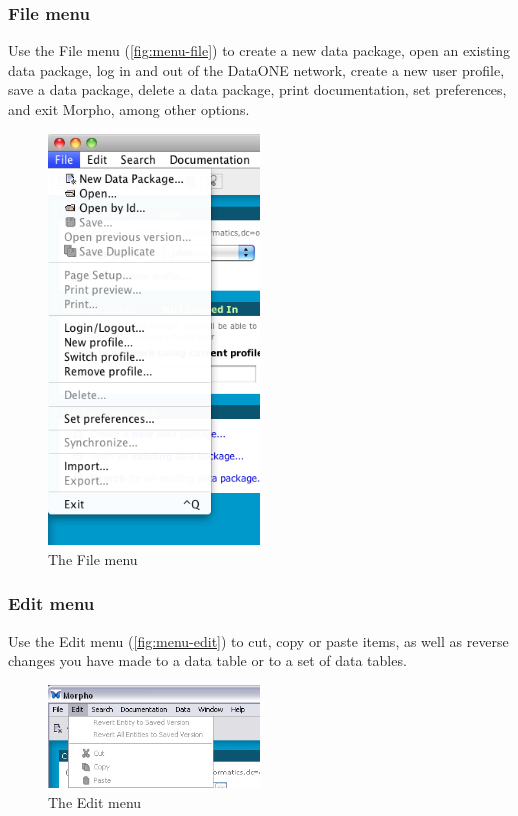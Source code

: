 \subsubsection{File menu} \label{sec:menu-file}

Use the File menu (\autoref{fig:menu-file}) to create a new data
package, open an existing data package, log in and out of the DataONE 
network, create a new user profile, save a data package, delete a data
package, print documentation, set preferences, and exit Morpho, among
other options. 

\begin{figure}
  \centering
    \includegraphics[width=0.5\textwidth]{images/menu-file.png}
  \caption{The File menu}
  \label{fig:menu-file}
\end{figure}

\subsubsection{Edit menu} \label{sec:menu-edit}

Use the Edit menu (\autoref{fig:menu-edit}) to cut, copy or paste items,
as well as reverse changes you have made to a data table or to a set of
data tables.

\begin{figure}
  \centering
    \includegraphics[width=0.5\textwidth]{images/menu-edit.jpg}
  \caption{The Edit menu}
  \label{fig:menu-edit}
\end{figure}

